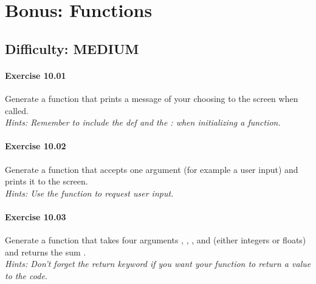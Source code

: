 \chapter{Bonus: Functions}\label{CHAP_Functions}

\section{Difficulty: MEDIUM}


\subsubsection*{Exercise 10.01}

Generate a function {} that prints a message of your choosing to the screen
when called.\\

\textit{Hints:
Remember to include the def and the : when initializing a function.}\\[1cm]



\subsubsection*{Exercise 10.02}
Generate a function {} that accepts one argument (for
example a user input) and prints it to the screen.\\

\textit{Hints:
Use the {} function to request user input.}\\[1cm]



\subsubsection*{Exercise 10.03}
Generate a function {} that takes four arguments {}, {}, {}, and {} (either integers or floats) and returns the sum {}.\\

\textit{Hints:
Don’t forget the return keyword if you want your function to return a value to the code.}\\[1cm]



